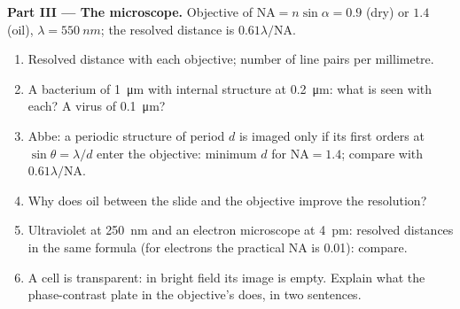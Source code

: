 \begin{problem}
\medskip
\noindent\textbf{Part III --- The microscope.}
Objective of  $\mathrm{NA} = n\sin\alpha = 0.9$ (dry) or $1.4$
(oil), $\lambda = \qty{550}{nm}$; the resolved distance is $0.61\lambda/\mathrm{NA}$.
\begin{enumerate}[resume]
  \item Resolved distance with each objective; number of line pairs
        per millimetre.
  \item A bacterium of \qty{1}{\micro m} with internal structure at
        \qty{0.2}{\micro m}: what is seen with each? A virus of \qty{0.1}{\micro m}?
  \item Abbe: a periodic structure of period $d$ is imaged only if its
        first orders at $\sin\theta = \lambda/d$ enter the objective: minimum $d$
        for $\mathrm{NA} = 1.4$; compare with $0.61\lambda/\mathrm{NA}$.
  \item Why does oil between the slide and the objective improve the
        resolution?
  \item Ultraviolet at \qty{250}{nm} and an electron microscope at \qty{4}{pm}:
        resolved distances in the same formula (for electrons the
        practical NA is \qty{0.01}{}): compare.
  \item A cell is transparent: in bright field its image is empty.
        Explain what the phase-contrast plate in the objective's
         does, in two sentences.
\end{enumerate}


\end{problem}
